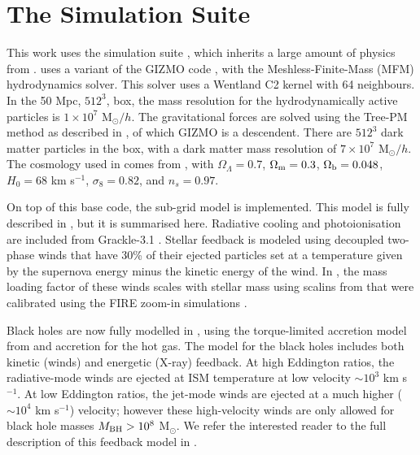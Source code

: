\section{The \simba{} Simulation Suite}
\label{sec:simba}

This work uses the \simba{} simulation suite \citep{dave2018}, which inherits a
large amount of physics from \mufasa{} \citep{dave2016}. \simba{} uses a
variant of the GIZMO code \citep{hopkins2015}, with the Meshless-Finite-Mass
(MFM) hydrodynamics solver. This solver uses a Wentland C2 kernel with
64 neighbours. In the 50 Mpc, $512^3$, box, the mass resolution for the
hydrodynamically active particles is $1\times10^7$ M$_\odot/h$. The
gravitational forces are solved using the Tree-PM method as described in
\citet{Springel2005}, of which GIZMO is a descendent. There are $512^3$ dark
matter particles in the box, with a dark matter mass resolution of
$7\times10^7$ M$_\odot/h$. The cosmology used in \simba{} comes from
\citet{PlanckCollaboration2016}, with $\Omega_\Lambda = 0.7$, $\Omega_{\rm m} =
0.3$, $\Omega_{\rm b} = 0.048$, $H_0 = 68$ km s$^{-1}$, $\sigma_8=0.82$, and
$n_s=0.97$.

On top of this base code, the \simba{} sub-grid model is implemented. This
model is fully described in \citet{dave2018}, but it is summarised here.
Radiative cooling and photoionisation are included from Grackle-3.1
\citep{smith2016}. Stellar feedback is modeled using decoupled two-phase winds
that have 30\% of their ejected particles set at a temperature given by the
supernova energy minus the kinetic energy of the wind. In \simba{}, the mass
loading factor of these winds scales with stellar mass using scalins from
\citet{muratov2015} that were calibrated using the FIRE zoom-in simulations
\citep{fireproject2014}.

Black holes are now fully modelled in \simba{}, using the torque-limited
accretion model from \citet{anglesalcazar2017} and \citet{bondi1952} accretion
for the hot gas. The model for the black holes includes both kinetic (winds)
and energetic (X-ray) feedback. At high Eddington ratios, the radiative-mode
winds are ejected at ISM temperature at low velocity $\sim 10^3$ km s$^{-1}$.
At low Eddington ratios, the jet-mode winds are ejected at a much higher ($\sim
10^4$ km s$^{-1}$) velocity; however these high-velocity winds are only allowed
for black hole masses $M_{\rm BH} > 10^8$ M$_\odot$. We refer the interested
reader to the full description of this feedback model in \citet{dave2018}.

